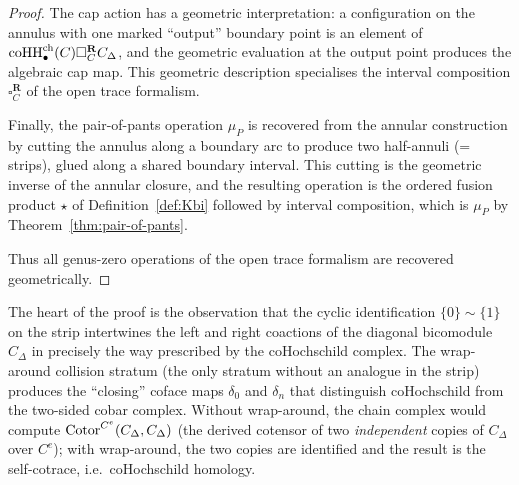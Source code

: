 \begin{proof}
The cap action has a geometric interpretation: a configuration
on the annulus with one marked ``output'' boundary point is an
element of
$\operatorname{coHH}^{\mathrm{ch}}_\bullet(C) \square_C^{\mathbf R} C_\Delta$,
and the geometric evaluation at the output point produces the
algebraic cap map. This geometric description specialises the
interval composition $\square_C^{\mathbf R}$ of the open trace
formalism.

Finally, the pair-of-pants operation $\mu_P$ is recovered from the
annular construction by cutting the annulus along a boundary
arc to produce two half-annuli (= strips), glued along a shared
boundary interval. This cutting is the geometric inverse of
the annular closure, and the resulting operation is the ordered
fusion product $\star$ of Definition~\ref{def:Kbi}
followed by interval composition, which is $\mu_P$
by Theorem~\ref{thm:pair-of-pants}.

Thus all genus-zero operations of the open trace formalism are
recovered geometrically.
\end{proof}

\begin{remark}
\label{rem:bordered-annular-strategy}
The heart of the proof is the observation that the cyclic
identification $\{0\} \sim \{1\}$ on the strip intertwines the
left and right coactions of the diagonal bicomodule $C_\Delta$
in precisely the way prescribed by the coHochschild complex.
The wrap-around collision stratum (the only stratum without an
analogue in the strip) produces the ``closing'' coface maps
$\delta_0$ and $\delta_n$ that distinguish coHochschild from the
two-sided cobar complex. Without wrap-around, the chain complex
would compute $\operatorname{Cotor}^{C^e}(C_\Delta, C_\Delta)$ (the derived
cotensor of two \emph{independent} copies of $C_\Delta$ over
$C^e$); with wrap-around, the two copies are identified and the
result is the self-cotrace, i.e.\ coHochschild homology.
\end{remark}

